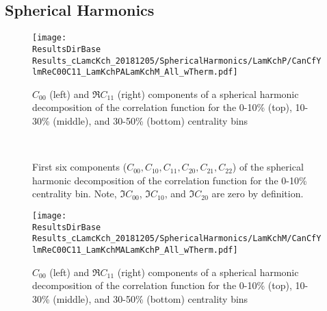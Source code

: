 \documentclass[/home/jesse/Analysis/FemtoAnalysis/AnalysisNotes/AnalysisNoteJBuxton.tex]{subfiles}
\begin{document}
\subsection{Spherical Harmonics}
\label{AdditionalFigures_SphericalHarmonics}



\begin{figure}[h]
  \centering
  \texttt{[image: \\ResultsDirBase Results\_cLamcKch\_20181205/SphericalHarmonics/LamKchP/CanCfYlmReC00C11\_LamKchPALamKchM\_All\_wTherm.pdf]}
  \caption[\LamKchP $C_{00}$ and $\Re C_{11}$ Spherical Harmonic Components]{$C_{00}$ (left) and $\Re C_{11}$ (right) components of a spherical harmonic decomposition of the \LamKchP correlation function for the 0-10\% (top), 10-30\% (middle), and 30-50\% (bottom) centrality bins}
  \label{fig:LamKchP_ReC00C11_All}
\end{figure}



\begin{figure}[h!]
  \centering
   \\
  \caption[\LamKchP First Six Components of Spherical Harmonic Decomposition (0-10\%)]{First six components ($C_{00}, C_{10}, C_{11}, C_{20}, C_{21}, C_{22}$) of the spherical harmonic decomposition of the \LamKchP correlation function for the 0-10\% centrality bin.
  Note, $\Im C_{00}$, $\Im C_{10}$, and $\Im C_{20}$ are zero by definition.}
  \label{fig:LamKchP_FirstSixCYlm}
\end{figure}











\begin{figure}[h]
  \centering
  \texttt{[image: \\ResultsDirBase Results\_cLamcKch\_20181205/SphericalHarmonics/LamKchM/CanCfYlmReC00C11\_LamKchMALamKchP\_All\_wTherm.pdf]}
  \caption[\LamKchM $C_{00}$ and $\Re C_{11}$ Spherical Harmonic Components]{$C_{00}$ (left) and $\Re C_{11}$ (right) components of a spherical harmonic decomposition of the \LamKchM correlation function for the 0-10\% (top), 10-30\% (middle), and 30-50\% (bottom) centrality bins}
  \label{fig:LamKchM_ReC00C11_All}
\end{figure}
\end{document}
